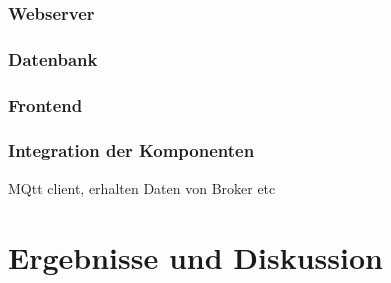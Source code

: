 \documentclass[12pt, letterpaper]{article}
\begin{document}
  \subsubsection{Webserver}
  \subsubsection{Datenbank}
  \subsubsection{Frontend}
  \subsubsection{Integration der Komponenten}
  \par MQtt client, erhalten Daten von Broker etc

\newpage
\section{Ergebnisse und Diskussion}

\newpage
\end{document}
